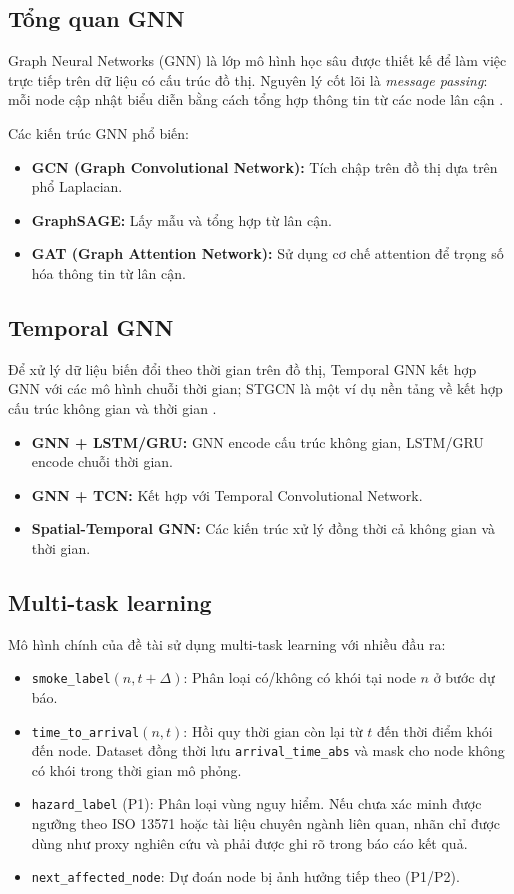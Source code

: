 \subsection{Tổng quan GNN}

Graph Neural Networks (GNN) là lớp mô hình học sâu được thiết kế để làm việc trực tiếp trên dữ liệu có cấu trúc đồ thị. Nguyên lý cốt lõi là \textit{message passing}: mỗi node cập nhật biểu diễn bằng cách tổng hợp thông tin từ các node lân cận \cite{kipf2017gcn,hamilton2017graphsage,velickovic2018gat}.

Các kiến trúc GNN phổ biến:
\begin{itemize}
  \item \textbf{GCN (Graph Convolutional Network):} Tích chập trên đồ thị dựa trên phổ Laplacian.
  \item \textbf{GraphSAGE:} Lấy mẫu và tổng hợp từ lân cận.
  \item \textbf{GAT (Graph Attention Network):} Sử dụng cơ chế attention để trọng số hóa thông tin từ lân cận.
\end{itemize}

\subsection{Temporal GNN}

Để xử lý dữ liệu biến đổi theo thời gian trên đồ thị, Temporal GNN kết hợp GNN với các mô hình chuỗi thời gian; STGCN là một ví dụ nền tảng về kết hợp cấu trúc không gian và thời gian \cite{yu2018stgcn}.
\begin{itemize}
  \item \textbf{GNN + LSTM/GRU:} GNN encode cấu trúc không gian, LSTM/GRU encode chuỗi thời gian.
  \item \textbf{GNN + TCN:} Kết hợp với Temporal Convolutional Network.
  \item \textbf{Spatial-Temporal GNN:} Các kiến trúc xử lý đồng thời cả không gian và thời gian.
\end{itemize}

\subsection{Multi-task learning}

Mô hình chính của đề tài sử dụng multi-task learning với nhiều đầu ra:
\begin{itemize}
  \item \texttt{smoke\_label}$(n,t+\Delta)$: Phân loại có/không có khói tại node $n$ ở bước dự báo.
  \item \texttt{time\_to\_arrival}$(n,t)$: Hồi quy thời gian còn lại từ $t$ đến thời điểm khói đến node. Dataset đồng thời lưu \texttt{arrival\_time\_abs} và mask cho node không có khói trong thời gian mô phỏng.
  \item \texttt{hazard\_label} (P1): Phân loại vùng nguy hiểm. Nếu chưa xác minh được ngưỡng theo ISO 13571 hoặc tài liệu chuyên ngành liên quan, nhãn chỉ được dùng như proxy nghiên cứu và phải được ghi rõ trong báo cáo kết quả.
  \item \texttt{next\_affected\_node}: Dự đoán node bị ảnh hưởng tiếp theo (P1/P2).
\end{itemize}

